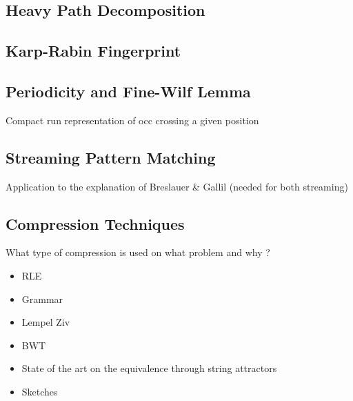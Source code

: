 


\subsection{Heavy Path Decomposition}\label{sec:prelim:HP}

\subsection{Karp-Rabin Fingerprint}\label{sec:prelim:KR}

\subsection{Periodicity and Fine-Wilf Lemma}
Compact run representation of occ crossing a given position

\subsection{Streaming Pattern Matching}
Application to the explanation of Breslauer \& Gallil (needed for both streaming)



\subsection{Compression Techniques}
What type of compression is used on what problem and why ?
\begin{itemize}
\item RLE
\item Grammar
\item Lempel Ziv
\item BWT
\item State of the art on the equivalence through string attractors
\item Sketches
\end{itemize}